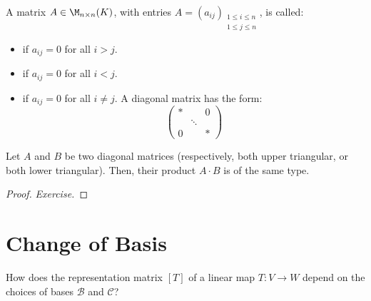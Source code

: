 \begin{definition}
\label{def:triangular_diagonal_matrices}
A matrix $A \in \M_{n \times n}(K)$, with entries $A = (a_{ij})_{\substack{1 \le i \le n \\ 1 \le j \le n}}$, is called:
\begin{itemize}
    \item {} if $a_{ij} = 0$ for all $i > j$.
    \item {} if $a_{ij} = 0$ for all $i < j$.
    \item {} if $a_{ij} = 0$ for all $i \neq j$. A diagonal matrix has the form:
    \begin{equation*}
        \begin{pmatrix} * & & 0 \\ & \ddots & \\ 0 & & * \end{pmatrix}
    \end{equation*}
\end{itemize}
\end{definition}

\begin{lemma}
\label{lemma:triangular_multiplication_closure}
Let $A$ and $B$ be two diagonal matrices (respectively, both upper triangular, or both lower triangular). Then, their product $A \cdot B$ is of the same type.
\end{lemma}

\begin{proof}
\textit{Exercise.}
\end{proof}

\section{Change of Basis}

\begin{question}
How does the representation matrix $[T]$ of a linear map $T: V \to W$ depend on the choices of bases $\mathcal{B}$ and $\mathcal{C}$?
\end{question}

